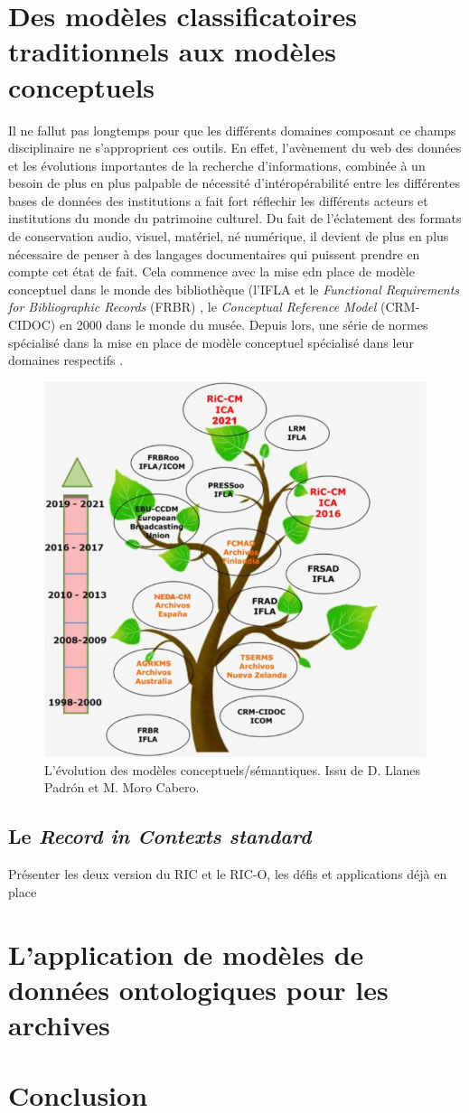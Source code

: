 \documentclass[12pt]{report}
\begin{document}
\newpage
\section{Des modèles classificatoires traditionnels aux modèles conceptuels}
Il ne fallut pas longtemps pour que les différents domaines composant ce champs disciplinaire ne s'approprient ces outils. En effet, l'avènement du web des données et les évolutions importantes de la recherche d'informations, combinée à un besoin de plus en plus palpable de nécessité d'intéropérabilité entre les différentes bases de données des institutions a fait fort réflechir les différents acteurs et institutions du monde du patrimoine culturel. Du fait de l'éclatement des formats de conservation audio, visuel, matériel, né numérique, il devient de plus en plus nécessaire de penser à des langages documentaires qui puissent prendre en compte cet état de fait. 
Cela commence avec la mise edn place de modèle conceptuel dans le monde des bibliothèque (l'IFLA et le \textit{Functional Requirements for Bibliographic Records} (FRBR)\autocite{IFLA1997Functional} , le \textit{Conceptual Reference Model} (CRM-CIDOC) en 2000 dans le monde du musée. Depuis lors, une série de normes spécialisé dans la mise en place de modèle conceptuel spécialisé dans leur domaines respectifs\autocite{Koch2021Moving, LlanesPadron2023RiC-CM} . 
\begin{figure}[h]
    \centering
    \includegraphics[scale = 0.4]{evolution_CM.png}
    \caption {L'évolution des modèles conceptuels/sémantiques. Issu de D. Llanes Padrón et M. Moro Cabero.}
    \label{fig:enter-label}
\end{figure}
\newline
\subsection{Le \textit{Record in Contexts standard}}
Présenter les deux version du RIC et le RIC-O, les défis et applications déjà en place
\section{L'application de modèles de données ontologiques pour les archives}
\section{Conclusion}
\end{document}
